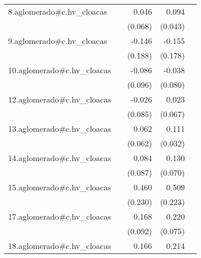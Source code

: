 {\begin{longtable}{l*{4}{D{.}{.}{-1}}}
\addlinespace
8.aglomerado#c.hv\_cloacas&                     &       0.046         &       0.094\sym{*}  &                     \\
            &                     &     (0.068)         &     (0.043)         &                     \\
\addlinespace
9.aglomerado#c.hv\_cloacas&                     &      -0.146         &      -0.155         &                     \\
            &                     &     (0.188)         &     (0.178)         &                     \\
\addlinespace
10.aglomerado#c.hv\_cloacas&                     &      -0.086         &      -0.038         &                     \\
            &                     &     (0.096)         &     (0.080)         &                     \\
\addlinespace
12.aglomerado#c.hv\_cloacas&                     &      -0.026         &       0.023         &                     \\
            &                     &     (0.085)         &     (0.067)         &                     \\
\addlinespace
13.aglomerado#c.hv\_cloacas&                     &       0.062         &       0.111\sym{***}&                     \\
            &                     &     (0.062)         &     (0.032)         &                     \\
\addlinespace
14.aglomerado#c.hv\_cloacas&                     &       0.084         &       0.130         &                     \\
            &                     &     (0.087)         &     (0.070)         &                     \\
\addlinespace
15.aglomerado#c.hv\_cloacas&                     &       0.460\sym{*}  &       0.509\sym{*}  &                     \\
            &                     &     (0.230)         &     (0.223)         &                     \\
\addlinespace
17.aglomerado#c.hv\_cloacas&                     &       0.168         &       0.220\sym{**} &                     \\
            &                     &     (0.092)         &     (0.075)         &                     \\
\addlinespace
18.aglomerado#c.hv\_cloacas&                     &       0.166\sym{*}  &       0.214\sym{***}&                     \\

\end{longtable}}
